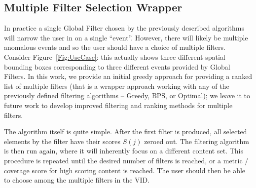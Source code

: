 \subsection{Multiple Filter Selection Wrapper}

In practice a single Global Filter chosen by the previously described algorithms will narrow the user in on a single \textquotedblleft event\textquotedblright{}. However, there will likely be multiple anomalous events and so the user should have a choice of multiple filters.  
Consider Figure~\ref{Fig:UseCase}: this actually shows three different spatial bounding boxes corresponding to three different events provided by Global Filters.
In this work, we provide an initial greedy approach for providing a ranked list of multiple filters (that is a wrapper approach working with any of the previously defined filtering algorithms -- Greedy, BPS, or Optimal); we leave it to future work to develop improved filtering and ranking methods for multiple filters.

The algorithm itself is quite simple.  After the first filter is produced, all selected elements by the filter have their scores $S(j)$ zeroed out.  The filtering algorithm is then run again, where it will inherently focus on a different content set.  This procedure is repeated until the desired number of filters is reached, or a metric / coverage score for high scoring content is reached.  The user should then be able to choose among the multiple filters in the VID. 	










